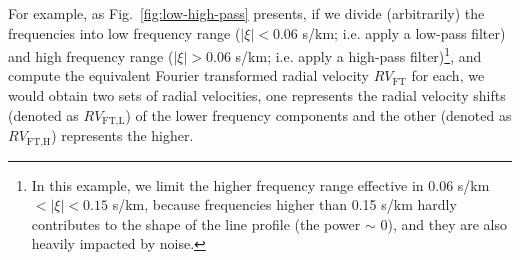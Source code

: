 For example, as Fig.~\ref{fig:low-high-pass} presents, if we divide (arbitrarily) the frequencies into low frequency range ($\mid\xi\mid<0.06$ s/km; i.e. apply a low-pass filter) and high frequency range ($\mid\xi\mid>0.06$ s/km; i.e. apply a high-pass filter)\footnote{In this example, we limit the higher frequency range effective in 0.06 s/km $<\mid\xi\mid<0.15$ s/km, because frequencies higher than 0.15 s/km hardly contributes to the shape of the line profile (the power $\sim$ 0), and they are also heavily impacted by noise.}, and compute the equivalent Fourier transformed radial velocity $RV_\text{FT}$ for each, we would obtain two sets of radial velocities, one represents the radial velocity shifts (denoted as $RV_\text{FT,L}$) of the lower frequency components and the other (denoted as $RV_\text{FT,H}$) represents the higher. 

